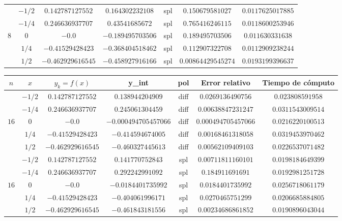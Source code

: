 \documentclass[letter, 10pt]{article}
\begin{document}
\begin{itemize}
\begin{center}
\begin{tabular}{|c|c|c|c|c|c|c|}
			& $ -1/2 $ & $ 0.142787127552 $ & $ 0.164302232108 $ &  spl  & $ 0.150679581027 $ & $ 0.0117625017885 $ \\ 
			& $ -1/4 $ & $ 0.246636937707 $ & $ 0.43541685672 $ &  spl  & $ 0.765416246115 $ & $ 0.0118600253946 $ \\ 
		$8$ & $ 0 $ & $ -0.0 $ & $ -0.189495703506 $ &  spl  & $ 0.189495703506 $ & $ 0.011630331638 $ \\ 
			& $ 1/4 $ & $ -0.41529428423 $ & $ -0.368404518462 $ &  spl  & $ 0.112907322708 $ & $ 0.0112909238244 $ \\ 
			& $ 1/2 $ & $ -0.462929616545 $ & $ -0.458927916166 $ &  spl  & $ 0.00864429545274 $ & $ 0.0193199396637 $ \\ 

		\hline
	\end{tabular}
\end{center}

\begin{center}
	\begin{tabular}{|c|c|c|c|c|c|c|}
		\hline
		$n$ & $x$ & $y_k = f(x)$ & y\_int & pol & \textbf{Error relativo} & \textbf{Tiempo de c\'omputo} \\
		\hline \hline
			& $ -1/2 $ & $ 0.142787127552 $ & $ 0.138944204909 $ &  diff  & $ 0.0269136490756 $ & $ 0.023808591958 $ \\ 
			& $ -1/4 $ & $ 0.246636937707 $ & $ 0.245061304459 $ &  diff  & $ 0.00638847231247 $ & $ 0.0311543009514 $ \\ 
		$16$& $ 0 $ & $ -0.0 $ & $ -0.000494705457066 $ &  diff  & $ 0.000494705457066 $ & $ 0.0216220100513 $ \\ 
			& $ 1/4 $ & $ -0.41529428423 $ & $ -0.414594674005 $ &  diff  & $ 0.00168461318058 $ & $ 0.0319453970462 $ \\ 
			& $ 1/2 $ & $ -0.462929616545 $ & $ -0.460327445613 $ &  diff  & $ 0.00562109409103 $ & $ 0.0226537071482 $ \\
		\hline
		
			& $ -1/2 $ & $ 0.142787127552 $ & $ 0.141770752843 $ &  spl  & $ 0.00711811160101 $ & $ 0.0198184649399 $ \\ 
			& $ -1/4 $ & $ 0.246636937707 $ & $ 0.292242991092 $ &  spl  & $ 0.184911691691 $ & $ 0.0192981251728 $ \\ 
		$16$& $ 0 $ & $ -0.0 $ & $ -0.0184401735992 $ &  spl  & $ 0.0184401735992 $ & $ 0.0256718061179 $ \\ 
			& $ 1/4 $ & $ -0.41529428423 $ & $ -0.404061996171 $ &  spl  & $ 0.0270465751299 $ & $ 0.0206685884805 $ \\ 
			& $ 1/2 $ & $ -0.462929616545 $ & $ -0.461843181556 $ &  spl  & $ 0.00234686861852 $ & $ 0.0190896043044 $ \\


\end{tabular}
\end{center}
\end{itemize}
\end{document}
